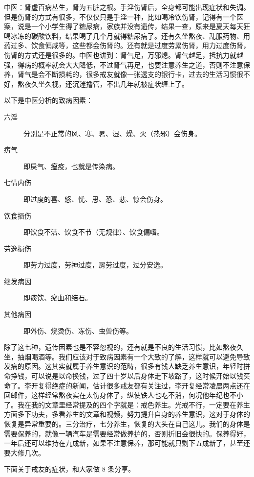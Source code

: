 \documentclass{ctexart}
\begin{document}
中医：肾虚百病丛生，肾为五脏之根。手淫伤肾后，全身都可能出现症状和失调。但是伤肾的方式有很多，不仅仅只是手淫一种，比如喝冷饮伤肾，记得有一个医案，说是一个小学生得了糖尿病，家族并没有遗传，结果一查，原来是夏天每天狂喝冰冻的碳酸饮料，结果喝了几个月就得糖尿病了。还有久坐熬夜、乱服药物、用药过多、饮食偏咸等，这些都会伤肾的。还有就是过度劳累伤肾，用力过度伤肾，伤肾的方式还是很多的。中医也讲到：肾气足，万邪熄。肾气越足，抵抗力就越强，得病的概率就会大大降低，不过肾气再足，也要注意养生之道，否则不注意保养，肾气是会不断损耗的，很多戒友就像一张透支的银行卡，过去的生活习惯很不好，熬夜久坐久视，还沉迷撸管，不出几年就被症状缠上了。

以下是中医分析的致病因素：

\begin{description}
    \item[六淫] 分别是不正常的风、寒、暑、湿、燥、火（热邪）会伤身。
    \item[疠气] 即戾气、瘟疫，也就是传染病。
    \item[七情内伤] 即过度的喜、怒、忧、思、恐、悲、惊会伤身。
    \item[饮食损伤] 即饮食不洁、饮食不节（无规律）、饮食偏嗜。
    \item[劳逸损伤] 即劳力过度，劳神过度，房劳过度，过分安逸。
    \item[继发病因] 即痰饮、瘀血和结石。
    \item[其他病因] 即外伤、烧烫伤、冻伤、虫兽伤等。
\end{description}

除了这七种，遗传因素也是不容忽视的，还有就是不良的生活习惯，比如熬夜久坐，抽烟喝酒等。我们应该对于致病因素有一个大致的了解，这样就可以避免导致发病的原因。这其实就属于养生意识的范畴，很多有钱人缺乏养生意识，年轻时拼命挣钱，可以说是以命换钱，过了四十岁以后身体走下坡路了，这时候开始以钱买命了。李开复得绝症的新闻，估计很多戒友都有关注过，李开复经常凌晨两点还在回邮件，这样经常熬夜实在太伤身体了，纵使铁人也吃不消，何况他年纪也不小了。我在我的文章里经常提及的四个字就是：戒色养生。光戒不行，一定要在养生方面多下功夫，多看养生的文章和视频，努力提升自身的养生意识，这对于身体的恢复是异常重要的。三分治疗，七分养生，恢复的大头在自己这儿。我们的身体是需要保养的，就像一辆汽车是需要经常做养护的，否则折旧会很快的。保养得好，一年后还可以维持在九成新，如果不注意保养，那可能就只剩下五成新了，甚至还要大修几次。

下面关于戒友的症状，和大家做 8 条分享。
\end{document}

